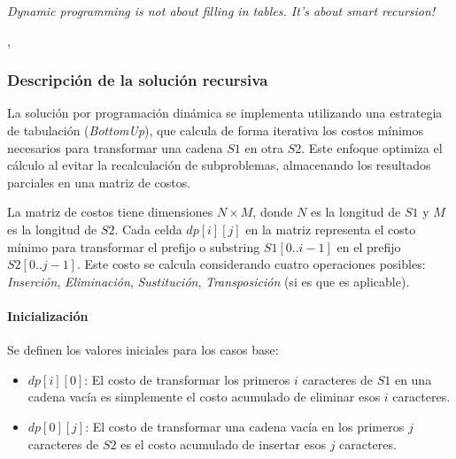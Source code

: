 \epigraph{\textit{Dynamic programming is not about filling in tables. It's about smart recursion!}}{\citeauthor{algorithms_erickson}, \citeyear{algorithms_erickson} \cite{algorithms_erickson}}


\subsubsection{Descripción de la solución recursiva}

La solución por programación dinámica se implementa utilizando una estrategia de tabulación (\textit{Bottom\-Up}), que calcula de forma iterativa los costos mínimos necesarios para transformar una cadena \( S1 \) en otra \( S2 \). Este enfoque optimiza el cálculo al evitar la recalculación de subproblemas, almacenando los resultados parciales en una matriz de costos.

La matriz de costos tiene dimensiones \( N \times M \), donde \( N \) es la longitud de \( S1 \) y \( M \) es la longitud de \( S2 \). Cada celda \( dp[i][j] \) en la matriz representa el costo mínimo para transformar el prefijo o substring \( S1[0..i-1] \) en el prefijo \( S2[0..j-1] \). Este costo se calcula considerando cuatro operaciones posibles: \textit{Inserción}, \textit{Eliminación}, \textit{Sustitución}, 
\textit{Transposición} (si es que es aplicable).

\paragraph{Inicialización}
Se definen los valores iniciales para los casos base:
\begin{itemize}
    \item \( dp[i][0] \): El costo de transformar los primeros \( i \) caracteres de \( S1 \) en una cadena vacía es simplemente el costo acumulado de eliminar esos \( i \) caracteres.
    \item \( dp[0][j] \): El costo de transformar una cadena vacía en los primeros \( j \) caracteres de \( S2 \) es el costo acumulado de insertar esos \( j \) caracteres.
\end{itemize}

